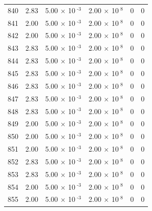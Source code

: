 \documentclass[a4paper,11pt]{article}
\begin{document}
\begin{center}
\begin{longtable}{|R{1.5cm}|R{2.4cm}|R{2.4cm}|R{2.4cm}|R{2.4cm}|R{2.4cm}|}
  840 &   2.83  &         5.00 $\times$ 10$^{\text{          -3}}$  &         2.00 $\times$ 10$^{\text{           8}}$  & 0  & 0 \\
  841 &   2.00  &         5.00 $\times$ 10$^{\text{          -3}}$  &         2.00 $\times$ 10$^{\text{           8}}$  & 0  & 0 \\
  842 &   2.00  &         5.00 $\times$ 10$^{\text{          -3}}$  &         2.00 $\times$ 10$^{\text{           8}}$  & 0  & 0 \\
  843 &   2.83  &         5.00 $\times$ 10$^{\text{          -3}}$  &         2.00 $\times$ 10$^{\text{           8}}$  & 0  & 0 \\
  844 &   2.83  &         5.00 $\times$ 10$^{\text{          -3}}$  &         2.00 $\times$ 10$^{\text{           8}}$  & 0  & 0 \\
  845 &   2.83  &         5.00 $\times$ 10$^{\text{          -3}}$  &         2.00 $\times$ 10$^{\text{           8}}$  & 0  & 0 \\
  846 &   2.83  &         5.00 $\times$ 10$^{\text{          -3}}$  &         2.00 $\times$ 10$^{\text{           8}}$  & 0  & 0 \\
  847 &   2.83  &         5.00 $\times$ 10$^{\text{          -3}}$  &         2.00 $\times$ 10$^{\text{           8}}$  & 0  & 0 \\
  848 &   2.83  &         5.00 $\times$ 10$^{\text{          -3}}$  &         2.00 $\times$ 10$^{\text{           8}}$  & 0  & 0 \\
  849 &   2.00  &         5.00 $\times$ 10$^{\text{          -3}}$  &         2.00 $\times$ 10$^{\text{           8}}$  & 0  & 0 \\
  850 &   2.00  &         5.00 $\times$ 10$^{\text{          -3}}$  &         2.00 $\times$ 10$^{\text{           8}}$  & 0  & 0 \\
  851 &   2.00  &         5.00 $\times$ 10$^{\text{          -3}}$  &         2.00 $\times$ 10$^{\text{           8}}$  & 0  & 0 \\
  852 &   2.83  &         5.00 $\times$ 10$^{\text{          -3}}$  &         2.00 $\times$ 10$^{\text{           8}}$  & 0  & 0 \\
  853 &   2.83  &         5.00 $\times$ 10$^{\text{          -3}}$  &         2.00 $\times$ 10$^{\text{           8}}$  & 0  & 0 \\
  854 &   2.00  &         5.00 $\times$ 10$^{\text{          -3}}$  &         2.00 $\times$ 10$^{\text{           8}}$  & 0  & 0 \\
  855 &   2.00  &         5.00 $\times$ 10$^{\text{          -3}}$  &         2.00 $\times$ 10$^{\text{           8}}$  & 0  & 0 \\

\end{longtable}
\end{center}
\end{document}
